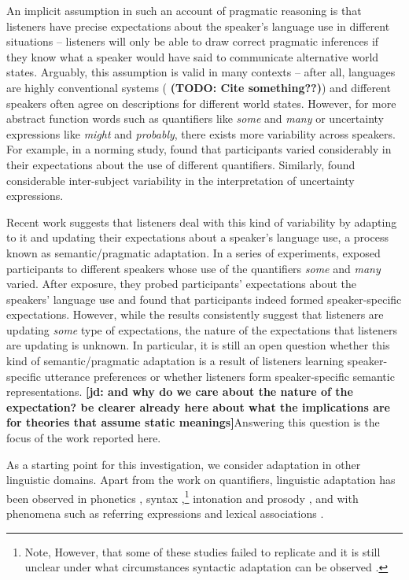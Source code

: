 \documentclass[lucida,biblatex]{sp} %
\newcommand{\jd}[1]{\textcolor{PinkyPurple}{\textbf{[jd: #1]}}}
\newcommand{\todo}[1]{}
\renewcommand{\todo}[1]{{\bf \color{red} (TODO: {#1})}}
\begin{document}
An implicit assumption in such an account of pragmatic reasoning is that listeners have precise expectations about the speaker's language use in different situations -- listeners will only be able to draw correct pragmatic inferences if they know what a speaker would have said to communicate alternative world states. Arguably, this assumption is valid in many contexts -- after all, languages are highly conventional systems (\todo{Cite something??}) and different speakers  often agree on descriptions for different world states. However, for more abstract function words such as quantifiers like \textit{some} and \textit{many} or uncertainty expressions like \textit{might} and \textit{probably}, there exists more variability across speakers. For example, in a norming study, \citet{Yildirim2016} found that participants varied considerably in their expectations about the use of different quantifiers. Similarly, \citet{Wallsten1986} found considerable inter-subject variability in the interpretation of uncertainty expressions. 

Recent work suggests that listeners deal with this kind of variability by adapting to it and updating their expectations about a speaker's language use, a process known as semantic/pragmatic adaptation. In a series of experiments, \citet{Yildirim2016} exposed participants to different speakers whose use of the quantifiers \textit{some} and \textit{many} varied. After exposure, they probed participants' expectations about the speakers' language use and found that participants indeed formed speaker-specific expectations. However, while the results consistently suggest that listeners are updating \textit{some} type of expectations, the nature of the expectations that listeners are updating is unknown. 
In particular, it is still an open question whether this kind of semantic/pragmatic adaptation is a result of listeners learning speaker-specific utterance preferences or whether listeners form speaker-specific semantic representations. 
\jd{and why do we care about the nature of the expectation? be clearer already here about what the implications are for theories that assume static meanings}Answering this question is the focus of the work reported here.

As a starting point for this investigation, we consider adaptation in other linguistic domains. Apart from the work on quantifiers, linguistic adaptation has been observed in  phonetics \citep[e.g.,][]{Goldinger1998,Norris2003,Kraljic2005,Kraljic2007,Babel2012,Kleinschmidt2015}, 
syntax \citep{Kamide2012,Fine2013,Fine2016,Myslin2016,Kroczek2017},\footnote{Note, 
However, that some of these studies failed to replicate and it is still unclear under what 
circumstances syntactic adaptation can be observed \citep[see ][]{Liu2017,HarringtonStack2018}.} intonation and prosody \citep{Kurumada2012,Roettger2019}, and with phenomena such as referring expressions
\citep{Clark1986,Brennan1996,Metzing2003,Horton2005,Brennan2009} and lexical associations \citep{DelaneyBusch2019}. 
\end{document}
